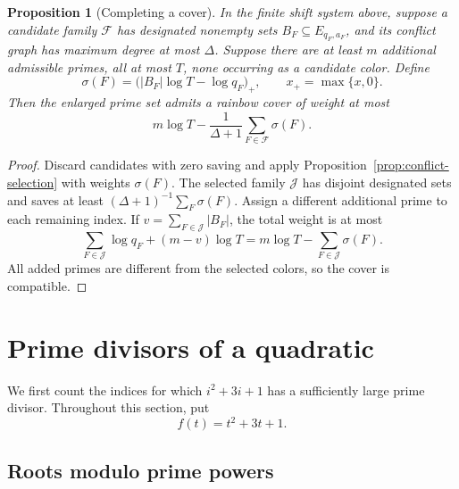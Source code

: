 \documentclass[11pt]{amsart}
\newtheorem{proposition}[theorem]{Proposition}
\theoremstyle{definition}
\theoremstyle{remark}
\begin{document}
\begin{proposition}[Completing a cover]\label{prop:completion}
In the finite shift system above, suppose a candidate family $\mathcal F$
has designated nonempty sets $B_F\subseteq E_{q_F,a_F}$, and its conflict
graph has maximum degree at most $\Delta$. Suppose there are at least $m$
additional admissible primes, all at most $T$, none occurring as a
candidate color. Define
\[
\sigma(F)=\bigl(|B_F|\log T-\log q_F\bigr)_+,
\qquad x_+=\max\{x,0\}.
\]
Then the enlarged prime set admits a rainbow cover of weight at most
\[
m\log T-\frac1{\Delta+1}\sum_{F\in\mathcal F}\sigma(F).
\]
\end{proposition}
\begin{proof}
Discard candidates with zero saving and apply
Proposition~\ref{prop:conflict-selection} with weights $\sigma(F)$.
The selected family $\mathcal J$ has disjoint designated sets and
saves at least $(\Delta+1)^{-1}\sum_F\sigma(F)$.
Assign a different additional prime to each remaining index. If
$v=\sum_{F\in\mathcal J}|B_F|$, the total weight is at most
\[
\sum_{F\in\mathcal J}\log q_F+(m-v)\log T
=m\log T-\sum_{F\in\mathcal J}\sigma(F).
\]
All added primes are different from the selected colors, so the cover is
compatible.
\end{proof}

\section{Prime divisors of a quadratic}\label{sec:quadratic}

We first count the indices for which $i^2+3i+1$ has a sufficiently
large prime divisor. Throughout this section, put
\[
f(t)=t^2+3t+1.
\]

\subsection{Roots modulo prime powers}
\end{document}

